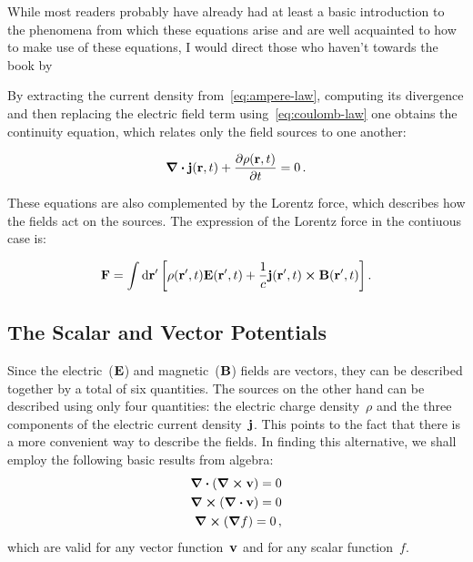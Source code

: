 \documentclass[12pt, class=report, crop=false]{standalone}
\begin{document}
\par
While most readers probably have already had at least a basic introduction to the phenomena from which these equations arise and are well acquainted to how to make use of these equations, I would direct those who haven't towards the book by~\cite{fleischStudentGuideMaxwell2008}%

\par
By extracting the current density from~\cref{eq:ampere-law}, computing its divergence and then replacing the electric field term using~\cref{eq:coulomb-law} one obtains the continuity equation, which relates only the field sources to one another:

\begin{equation}
  \label{eq:continuity-equation}
  \div{\vb{j}(\vb{r}, t)} + \pdv{\rho(\vb{r}, t)}{t} = 0 \,.
\end{equation}

\par
These equations are also complemented by the Lorentz force, which describes how the fields act on the sources. The expression of the Lorentz force in the contiuous case is:

\[
  \vb{F} = \int \dd{\vb{r}'} \left[ \rho(\vb{r}', t) \vb{E}(\vb{r}', t) +
           \frac{1}{c} \vb{j}(\vb{r}', t) \cross \vb{B}(\vb{r}', t)\right] .
\]

\subsection{The Scalar and Vector Potentials}

Since the electric~(\(\vb{E}\)) and magnetic~(\(\vb{B}\)) fields are vectors, they can be described together by a total of six quantities. The sources on the other hand can be described using only four quantities: the electric charge density~\(\rho\) and the three components of the electric current density~\(\vb{j}\). This points to the fact that there is a more convenient way to describe the fields. In finding this alternative, we shall employ the following basic results from algebra:
\begin{subequations}
  \label{id:algebra}
  \begin{align}
    \div{(\curl{\vb{v}})}=0
    \label{id:div-rot} \\
    \curl{(\div{\vb{v}})}=0
    \label{id:rot-div} \\
    \curl{(\grad{f})}=0
    \label{id:rot-grad} \,,
  \end{align}
\end{subequations}
which are valid for any vector function~\(\vb{v}\) and for any scalar function~\(f\).
\end{document}
